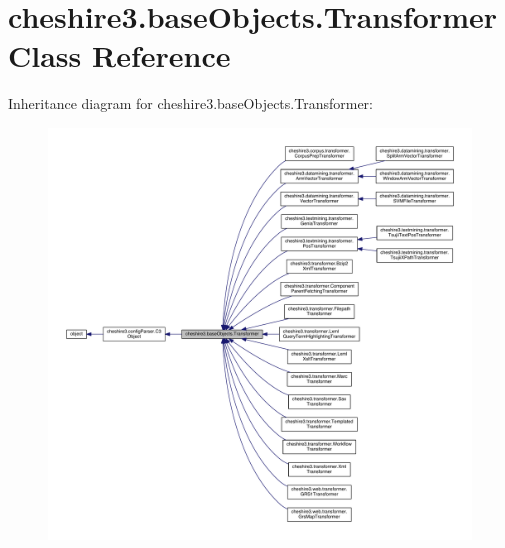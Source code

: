 \hypertarget{classcheshire3_1_1base_objects_1_1_transformer}{\section{cheshire3.\-base\-Objects.\-Transformer Class Reference}
\label{classcheshire3_1_1base_objects_1_1_transformer}
}


Inheritance diagram for cheshire3.\-base\-Objects.\-Transformer\-:
\nopagebreak
\begin{figure}[H]
\begin{center}
\leavevmode
\includegraphics[width=350pt]{classcheshire3_1_1base_objects_1_1_transformer__inherit__graph}
\end{center}
\end{figure}



